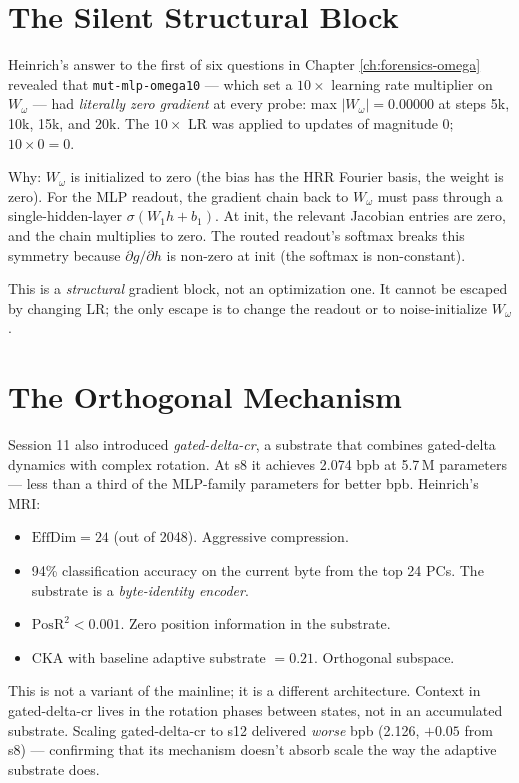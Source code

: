 \documentclass[11pt,openany]{book}
\theoremstyle{definition}
\theoremstyle{plain}
\newcommand{\effdim}{\mathrm{EffDim}}
\newcommand{\posr}{\mathrm{PosR^2}}
\newcommand{\cka}{\mathrm{CKA}}
\newcommand{\omegaproj}{W_\omega}
\begin{document}
\section{The Silent Structural Block}

Heinrich's answer to the first of six questions in Chapter
\ref{ch:forensics-omega} revealed that \texttt{mut-mlp-omega10} --- which
set a $10\times$ learning rate multiplier on $\omegaproj$ --- had
\emph{literally zero gradient} at every probe: max $|\omegaproj| =
0.00000$ at steps 5k, 10k, 15k, and 20k. The $10\times$ LR was applied
to updates of magnitude $0$; $10 \times 0 = 0$.

Why: $\omegaproj$ is initialized to zero (the bias has the HRR Fourier
basis, the weight is zero). For the MLP readout, the gradient chain back
to $\omegaproj$ must pass through a single-hidden-layer $\sigma(W_1 h +
b_1)$. At init, the relevant Jacobian entries are zero, and the chain
multiplies to zero. The routed readout's softmax breaks this symmetry
because $\partial g / \partial h$ is non-zero at init (the softmax is
non-constant).

This is a \emph{structural} gradient block, not an optimization one. It
cannot be escaped by changing LR; the only escape is to change the
readout or to noise-initialize $\omegaproj$.

\section{The Orthogonal Mechanism}

Session 11 also introduced \emph{gated-delta-cr}, a substrate that
combines gated-delta dynamics with complex rotation. At s8 it achieves
2.074 bpb at 5.7\,M parameters --- less than a third of the MLP-family
parameters for better bpb. Heinrich's MRI:
\begin{itemize}
  \item $\effdim = 24$ (out of 2048). Aggressive compression.
  \item 94\% classification accuracy on the current byte from the top
    24 PCs. The substrate is a \emph{byte-identity encoder}.
  \item $\posr < 0.001$. Zero position information in the substrate.
  \item $\cka$ with baseline adaptive substrate $= 0.21$. Orthogonal
    subspace.
\end{itemize}

This is not a variant of the mainline; it is a different architecture.
Context in gated-delta-cr lives in the rotation phases between states,
not in an accumulated substrate. Scaling gated-delta-cr to s12 delivered
\emph{worse} bpb (2.126, $+0.05$ from s8) --- confirming that its
mechanism doesn't absorb scale the way the adaptive substrate does.
\end{document}

